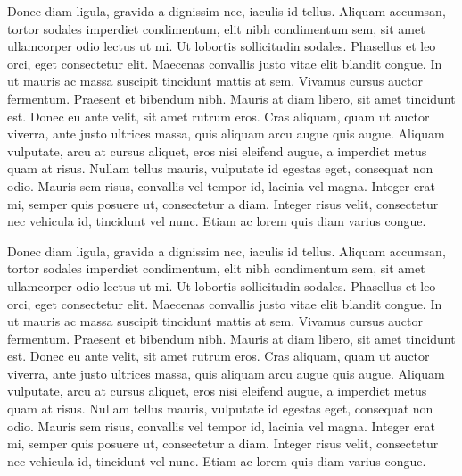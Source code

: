 Donec diam ligula, gravida a dignissim nec, iaculis id tellus. Aliquam accumsan, tortor sodales imperdiet condimentum, elit nibh condimentum sem, sit amet ullamcorper odio lectus ut mi. Ut lobortis sollicitudin sodales. Phasellus et leo orci, eget consectetur elit. Maecenas convallis justo vitae elit blandit congue. In ut mauris ac massa suscipit tincidunt mattis at sem. Vivamus cursus auctor fermentum. Praesent et bibendum nibh. Mauris at diam libero, sit amet tincidunt est. Donec eu ante velit, sit amet rutrum eros. Cras aliquam, quam ut auctor viverra, ante justo ultrices massa, quis aliquam arcu augue quis augue. Aliquam vulputate, arcu at cursus aliquet, eros nisi eleifend augue, a imperdiet metus quam at risus. Nullam tellus mauris, vulputate id egestas eget, consequat non odio. Mauris sem risus, convallis vel tempor id, lacinia vel magna. Integer erat mi, semper quis posuere ut, consectetur a diam. Integer risus velit, consectetur nec vehicula id, tincidunt vel nunc. Etiam ac lorem quis diam varius congue.

Donec diam ligula, gravida a dignissim nec, iaculis id tellus. Aliquam accumsan, tortor sodales imperdiet condimentum, elit nibh condimentum sem, sit amet ullamcorper odio lectus ut mi. Ut lobortis sollicitudin sodales. Phasellus et leo orci, eget consectetur elit. Maecenas convallis justo vitae elit blandit congue. In ut mauris ac massa suscipit tincidunt mattis at sem. Vivamus cursus auctor fermentum. Praesent et bibendum nibh. Mauris at diam libero, sit amet tincidunt est. Donec eu ante velit, sit amet rutrum eros. Cras aliquam, quam ut auctor viverra, ante justo ultrices massa, quis aliquam arcu augue quis augue. Aliquam vulputate, arcu at cursus aliquet, eros nisi eleifend augue, a imperdiet metus quam at risus. Nullam tellus mauris, vulputate id egestas eget, consequat non odio. Mauris sem risus, convallis vel tempor id, lacinia vel magna. Integer erat mi, semper quis posuere ut, consectetur a diam. Integer risus velit, consectetur nec vehicula id, tincidunt vel nunc. Etiam ac lorem quis diam varius congue.